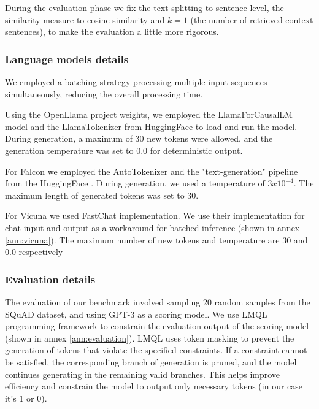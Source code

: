 \documentclass[a4paper,12pt]{article}
\begin{document}
During the evaluation phase we fix the text splitting to sentence level, the similarity measure to cosine similarity and $k=1$ (the number of retrieved context sentences), to make the evaluation a little more rigorous.  

\subsubsection*{Language models details}
We employed a batching strategy processing multiple input sequences simultaneously, reducing the overall processing time.

Using the OpenLlama project \cite{openllama} weights, we employed the LlamaForCausalLM model and the LlamaTokenizer from HuggingFace \cite{huggingface} to load and run the model. 
During generation, a maximum of 30 new tokens were allowed, and the generation temperature was set to 0.0 for deterministic output. 

For Falcon \cite{falcon} we employed the AutoTokenizer and the "text-generation" pipeline from the HuggingFace \cite{huggingface}. 
During generation, we used a temperature of $3x10^{-4}$. The maximum length of generated tokens was set to 30.

For Vicuna \cite{vicuna} we used FastChat \cite{fastchat} implementation.
We use their implementation for chat input and output as a workaround for batched inference (shown in annex \ref*{ann:vicuna}). 
The maximum number of new tokens and temperature are 30 and 0.0 respectively 

\subsubsection*{Evaluation details}
The evaluation of our benchmark involved sampling 20 random samples from the SQuAD \cite{squad} dataset, and using GPT-3 \cite{gpt3} as a scoring model.
We use LMQL \cite{lmql} programming framework to constrain the evaluation output of the scoring model (shown in annex \ref*{ann:evaluation}). LMQL uses token masking to prevent the generation of tokens that violate the specified constraints. 
If a constraint cannot be satisfied, the corresponding branch of generation is pruned, and the model continues generating in the remaining valid branches. This helps improve efficiency and constrain the model to output only necessary tokens 
(in our case it's 1 or 0).

\newpage
\end{document}
